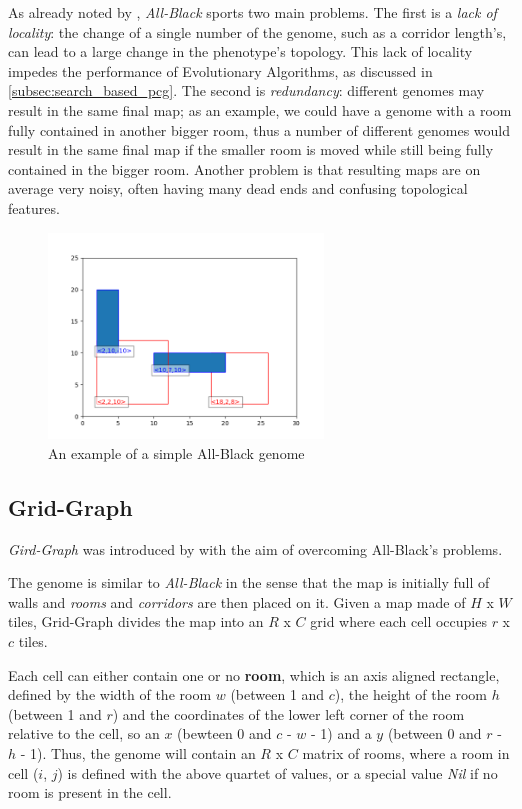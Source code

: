\documentclass{Configuration_Files/PoliMi3i_thesis}
\begin{document}
As already noted by \citeauthor{bari_evolutionary-based_2023}, \textit{All-Black} sports two main problems. The first is a \textit{lack of locality}: the change of a single number of the genome, such as a corridor length's, can lead to a large change in the phenotype's topology. This lack of locality impedes the performance of Evolutionary Algorithms, as discussed in \ref{subsec:search_based_pcg}. The second is \textit{redundancy}: different genomes may result in the same final map; as an example, we could have a genome with a room fully contained in another bigger room, thus a number of different genomes would result in the same final map if the smaller room is moved while still being fully contained in the bigger room. Another problem is that resulting maps are on average very noisy, often having many dead ends and confusing topological features.

\begin{figure}[H]
    \centering
    \includegraphics[width=0.65\textwidth]{images/ABGenome.png}
    \caption[All-Black example]{An example of a simple All-Black genome}
    \label{fig:all_black}
\end{figure}

\subsection{Grid-Graph}
\label{subsec:grid_graph}
\textit{Gird-Graph} was introduced by \citeauthor{bari_evolutionary-based_2023} with the aim of overcoming All-Black's problems.

The genome is similar to \textit{All-Black} in the sense that the map is initially full of walls and \textit{rooms} and \textit{corridors} are then placed on it. Given a map made of $H$ x $W$ tiles, Grid-Graph divides the map into an $R$ x $C$ grid where each cell occupies $r$ x $c$ tiles. 

Each cell can either contain one or no \textbf{room}, which is an axis aligned rectangle, defined by the width of the room $w$ (between 1 and $c$), the height of the room $h$ (between 1 and $r$) and the coordinates of the lower left corner of the room relative to the cell, so an $x$ (bewteen 0 and $c$ - $w$ - 1) and a $y$ (between 0 and $r$ - $h$ - 1). Thus, the genome will contain an $R$ x $C$ matrix of rooms, where a room in cell ($i$, $j$) is defined with the above quartet of values, or a special value \textit{Nil} if no room is present in the cell.
\end{document}
